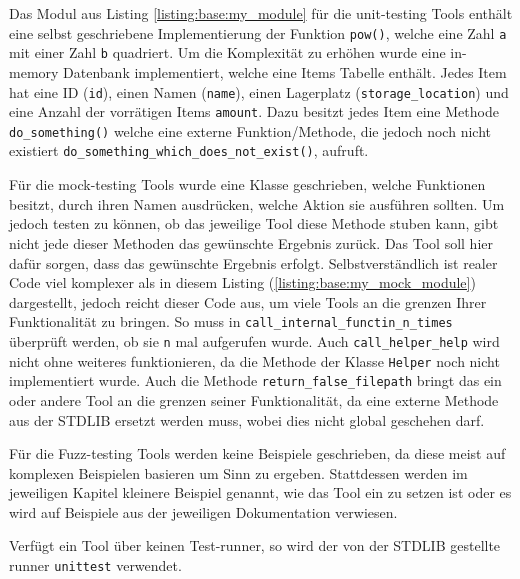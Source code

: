 Das Modul aus Listing \ref{listing:base:my_module} für die unit-testing Tools
enthält eine selbst geschriebene Implementierung der Funktion \lstinline|pow()|,
welche eine Zahl \lstinline|a| mit einer Zahl \lstinline|b| quadriert. Um die
Komplexität zu erhöhen wurde eine in-memory Datenbank implementiert, welche
eine Items Tabelle enthält. Jedes Item hat eine ID (\lstinline|id|), einen Namen
(\lstinline|name|), einen Lagerplatz (\lstinline|storage_location|) und eine
Anzahl der vorrätigen Items \lstinline|amount|. Dazu besitzt jedes Item eine
Methode \lstinline|do_something()| welche eine externe Funktion/Methode,
die jedoch noch nicht existiert \lstinline|do_something_which_does_not_exist()|,
aufruft.

Für die \gls{mock}-testing Tools wurde eine Klasse geschrieben, welche 
Funktionen besitzt, durch ihren Namen ausdrücken, welche Aktion sie ausführen 
sollten.
Um jedoch testen zu können, ob das jeweilige Tool diese Methode \gls{stub}en
kann, gibt nicht jede dieser Methoden das gewünschte Ergebnis zurück. Das Tool 
soll hier dafür sorgen, dass das gewünschte Ergebnis erfolgt.
Selbstverständlich ist realer Code viel komplexer als in diesem Listing
(\ref{listing:base:my_mock_module}) dargestellt, jedoch reicht dieser Code aus,
um viele Tools an die grenzen Ihrer Funktionalität zu bringen. So muss in
\lstinline{call_internal_functin_n_times} überprüft werden, ob sie \lstinline{n}
mal aufgerufen wurde. Auch \lstinline{call_helper_help} wird nicht ohne 
weiteres funktionieren, da die Methode der Klasse \lstinline{Helper} noch nicht 
implementiert wurde. Auch die Methode \lstinline{return_false_filepath}
bringt das ein oder andere Tool an die grenzen seiner Funktionalität, da eine 
externe Methode aus der STDLIB ersetzt werden muss, wobei dies nicht global 
geschehen darf.

Für die Fuzz-testing Tools werden keine Beispiele geschrieben, da diese meist 
auf komplexen Beispielen basieren um Sinn zu ergeben. Stattdessen werden im 
jeweiligen Kapitel kleinere Beispiel
genannt, wie das Tool ein zu setzen ist oder es wird auf Beispiele aus der jeweiligen Dokumentation
verwiesen.

Verfügt ein Tool über keinen Test-runner, so wird der von der STDLIB gestellte 
runner \lstinline{unittest} verwendet.



%




